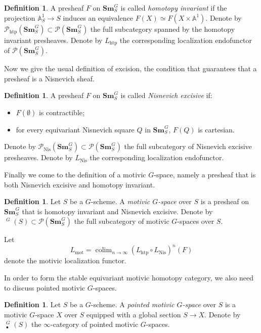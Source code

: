 \documentclass[edeposit,fullpage]{uiucthesis2009}
\newcommand{\mbb}{\mathbb}
\newcommand{\mc}{\mathcal}
\newcommand{\Sm}[1]{\mathbf{Sm}_{#1}}
\DeclareMathOperator*{\colim}{colim}
\DeclareMathOperator{\HH}{\underline{H}}
\theoremstyle{plain}
\numberwithin{lemma}{section}
\theoremstyle{definition}
\newtheorem{definition}[lemma]{Definition}
\begin{document}
\begin{definition}
A presheaf $F$ on $\Sm{S}^G$ is called \emph{homotopy invariant} if
the projection $\mbb A^1_S \rightarrow S$ induces an equivalence $F(X)
\simeq F(X \times \mbb A^1)$. Denote by $\mc
P_{\mathrm{htp}}(\Sm{S}^{G}) \subset \mc P(\Sm{S}^G)$ the full
subcategory spanned by the homotopy invariant presheaves. Denote by
$L_{\mathrm{htp}}$ the corresponding localization endofunctor of $\mc P(\Sm{S}^G)$.
\end{definition}

Now we give the usual definition of excision, the condition that
guarantees that a presheaf is a Nisnevich sheaf.

\begin{definition}
A presheaf $F$ on $\Sm{S}^G$ is called \emph{Nisnevich excisive} if:
\begin{itemize}
\item $F(\emptyset)$ is contractible;
\item for every equivariant Nisnevich square $Q$ in $\Sm{S}^G$, $F(Q)$ is
  cartesian. 
\end{itemize}

Denote by $\mc P_{\mathrm{Nis}}(\Sm{S}^G) \subset \mc P(\Sm{S}^G)$ the
full subcategory of Nisnevich excisive presheaves. Denote by
$L_{\mathrm{Nis}}$ the corresponding localization endofunctor. 
\end{definition}

Finally we come to the definition of a motivic $G$-space, namely a
presheaf that is both Nisnevich excisive and homotopy invariant.

\begin{definition}
Let $S$ be a $G$-scheme. A \emph{motivic $G$-space} over $S$ is a
presheaf on $\Sm{S}^G$ that is homotopy invariant and Nisnevich
excisive. Denote by $\HH^G(S) \subset \mc P(\Sm{S}^G)$ the full
subcategory of motivic $G$-spaces over $S$.

Let 
\[
L_{{\mathrm{mot}}} = \colim_{n \rightarrow \infty} (L_{\mathrm{htp}}
\circ L_{\mathrm{Nis}})^n(F)
\]
denote the motivic localization functor.
\end{definition}

In order to form the stable equivariant motivic homotopy category, we
also need to discuss pointed motivic $G$-spaces.

\begin{definition}
Let $S$ be a $G$-scheme. A \emph{pointed motivic $G$-space} over $S$
is a motivic $G$-space $X$ over $S$ equipped with a global section $S
\rightarrow X$. Denote by $\HH_\bullet^G(S)$ the $\infty$-category of
pointed motivic $G$-spaces. 
\end{definition}
\end{document}
